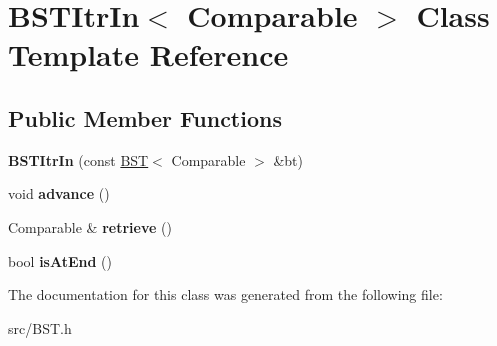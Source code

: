 \hypertarget{class_b_s_t_itr_in}{}\section{B\+S\+T\+Itr\+In$<$ Comparable $>$ Class Template Reference}
\label{class_b_s_t_itr_in}
\subsection*{Public Member Functions}
\begin{DoxyCompactItemize}
\item 
\hypertarget{class_b_s_t_itr_in_ac836e2f560fed9cc7ef8e5431a2836cc}{}{\bfseries B\+S\+T\+Itr\+In} (const \hyperlink{class_b_s_t}{B\+S\+T}$<$ Comparable $>$ \&bt)\label{class_b_s_t_itr_in_ac836e2f560fed9cc7ef8e5431a2836cc}

\item 
\hypertarget{class_b_s_t_itr_in_ac772d3ebbac748c5f8cf9bc659f2e32c}{}void {\bfseries advance} ()\label{class_b_s_t_itr_in_ac772d3ebbac748c5f8cf9bc659f2e32c}

\item 
\hypertarget{class_b_s_t_itr_in_ac7ac215c1247bd25fc1fdb8053826a32}{}Comparable \& {\bfseries retrieve} ()\label{class_b_s_t_itr_in_ac7ac215c1247bd25fc1fdb8053826a32}

\item 
\hypertarget{class_b_s_t_itr_in_a6f9a43217862c263a9bf15b9a08b889a}{}bool {\bfseries is\+At\+End} ()\label{class_b_s_t_itr_in_a6f9a43217862c263a9bf15b9a08b889a}

\end{DoxyCompactItemize}


The documentation for this class was generated from the following file\+:\begin{DoxyCompactItemize}
\item 
src/B\+S\+T.\+h\end{DoxyCompactItemize}

